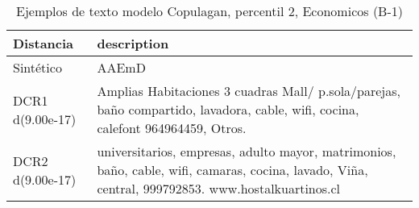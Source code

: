 \begin{table}[H]
\centering
\fontsize{10}{14}\selectfont
\caption{Ejemplos de texto modelo Copulagan, percentil 2, Economicos (B-1)}
\label{table-example-economicos-b-1-copulagan-2p-text}
\begin{tabular}{|l|m{35em}|}
\hline
\rowcolor[gray]{0.8}
Distancia & description \\
\hline Sintético & AAEmD \\
\hline DCR1 d(9.00e-17) & Amplias Habitaciones 3 cuadras Mall/ p.sola/parejas, ba\~no compartido, lavadora, cable, wifi, cocina, calefont 964964459, Otros. \\
\hline DCR2 d(9.00e-17) & universitarios, empresas, adulto mayor, matrimonios, ba\~no, cable, wifi, camaras, cocina, lavado, Vi\~na, central, 999792853. www.hostalkuartinos.cl \\
\hline
\end{tabular}
\end{table}
